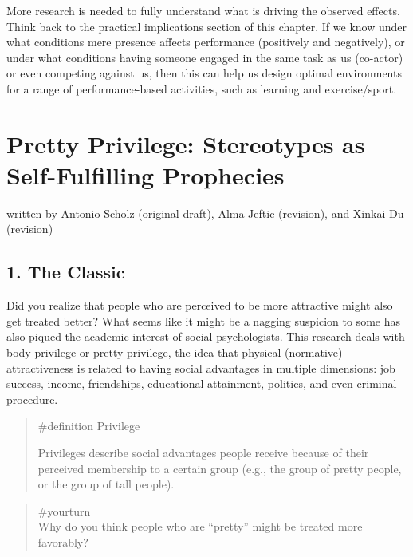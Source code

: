 \documentclass[
  letterpaper,
]{book}
\begin{document}
More research is needed to fully understand what is driving the observed
effects. Think back to the practical implications section of this
chapter. If we know under what conditions mere presence affects
performance (positively and negatively), or under what conditions having
someone engaged in the same task as us (co-actor) or even competing
against us, then this can help us design optimal environments for a
range of performance-based activities, such as learning and
exercise/sport.


\chapter{\texorpdfstring{{Pretty Privilege: Stereotypes as
Self-Fulfilling
Prophecies}}{Pretty Privilege: Stereotypes as Self-Fulfilling Prophecies}}\label{pretty-privilege-stereotypes-as-self-fulfilling-prophecies}

{written by Antonio Scholz (original draft), Alma Jeftic (revision), and
Xinkai Du (revision)}

\section{1. The Classic}\label{the-classic-10}

Did you realize that people who are perceived to be more attractive
might also get treated better? What seems like it might be a nagging
suspicion to some has also piqued the academic interest of social
psychologists. This research deals with body privilege or pretty
privilege, the idea that physical (normative) attractiveness is related
to having social advantages in multiple dimensions: job success, income,
friendships, educational attainment, politics, and even criminal
procedure.

\begin{quote}
\label{def-privilege}{\#definition} Privilege

Privileges describe social advantages people receive because of their
perceived membership to a certain group (e.g., the group of pretty
people, or the group of tall people).
\end{quote}

\begin{quote}
{\#yourturn}\\
Why do you think people who are ``pretty'' might be treated more
favorably?
\end{quote}
\end{document}
